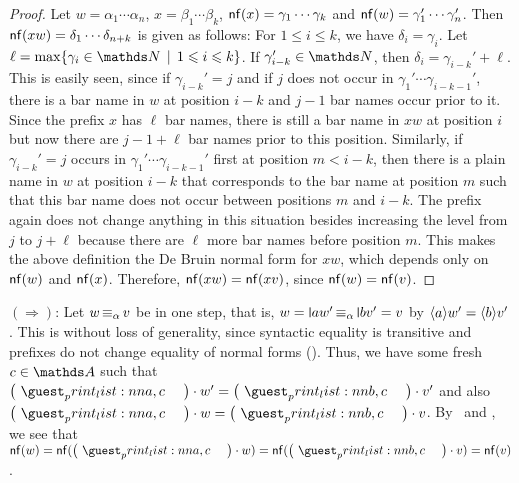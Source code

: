 \documentclass[a4paper,UKenglish,cleveref,autoref,thm-restate,numberwithinsect,final]{lipics-v2021}
\begin{document}
    \begin{proof}
        Let $w = \alpha_1 \cdots \alpha_n$, $x = \beta_1 \cdots \beta_k$, $\mathsf{nf}(x) = \gamma_1 \cdots \gamma_k$
        and $\mathsf{nf}(w) = \gamma_1' \cdots \gamma_n'$. Then $\mathsf{nf}(xw) = \delta_1 \cdots \delta_{n + k}$ is given as follows:
        For $1 \leqslant i \leqslant k$, we have $\delta_i = \gamma_i$. Let $\ell = \max
        \setw{\gamma_i \in \Nat}{1 \leqslant i \leqslant k}$. If $\gamma_{i - k}' \in \Nat$, then $\delta_i = 
        \gamma_{i - k}' + \ell$. This is easily seen, since if $\gamma_{i - k}' = j$ and if $j$ does not occur in
        $\gamma_1' \cdots \gamma_{i-k-1}'$, there is a bar name in $w$ at position $i - k$ and $j - 1$ bar names
        occur prior to it. Since the prefix $x$ has $\ell$ bar names, there is still a bar name in $xw$ at position
        $i$ but now there are $j - 1 + \ell$ bar names prior to this position. Similarly, if $\gamma_{i - k}' = j$ occurs
        in $\gamma_1' \cdots \gamma_{i-k-1}'$ first at position $m < i - k$, then there is a plain name in $w$ at position
        $i - k$ that corresponds to the bar name at position $m$ such that this bar name does not occur between
        positions $m$ and $i - k$. The prefix again does not change anything in this situation besides increasing the
        level from $j$ to $j + \ell$ because there are $\ell$ more bar names before position $m$. This makes the above
        definition the De Bruin normal form for $xw$, which depends only on $\mathsf{nf}(w)$ and $\mathsf{nf}(x)$. Therefore, $\mathsf{nf}(xw)
        = \mathsf{nf}(xv)$, since $\mathsf{nf}(w) = \mathsf{nf}(v)$.
    \end{proof}
    
        \noindent $(\Rightarrow)$: Let $w \operatorname{\equiv_{\alpha}} v$ be in one step, that is, $w = \newletter{a}w' 
        \alphaequiv \newletter{b}v' = v$ by $\langle a \rangle w' = \langle b \rangle v'$. This is without loss of generality, since syntactic
        equality is transitive and prefixes do not change equality of normal forms ().
        Thus, we have some fresh $c \in \names$ such that $\makecycle{a,c} \cdot w' = \makecycle{b,c} \cdot v'$
        and also $\makecycle{a,c} \cdot w = \makecycle{b,c} \cdot v$. By~ and
        , we see that
        $\nf(w) = \nf(\makecycle{a,c} \cdot w) = \nf(\makecycle{b,c} \cdot v) = \nf(v)$.
\end{document}
